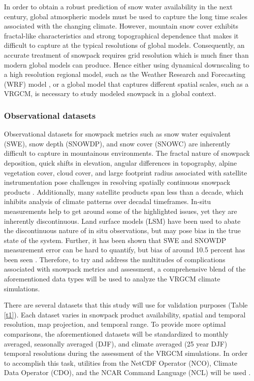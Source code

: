 \documentclass[11pt]{article}
\begin{document}
In order to obtain a robust prediction of snow water availability in the next century, global atmospheric models must be used to capture the long time scales associated with the changing climate.  However, mountain snow cover exhibits fractal-like characteristics and strong topographical dependence that makes it difficult to capture at the typical resolutions of global models. Consequently, an accurate treatment of snowpack requires grid resolution which is much finer than modern global models can produce. Hence either using dynamical downscaling to a high resolution regional model, such as the Weather Research and Forecasting (WRF) model \citep{michalakes2001development}, or a global model that captures different spatial scales, such as a VRGCM, is necessary to study modeled snowpack in a global context.

\subsubsection{Observational datasets} \label{sec:ObservationalData}

Observational datasets for snowpack metrics such as snow water equivalent (SWE), snow depth (SNOWDP), and snow cover (SNOWC) are inherently difficult to capture in mountainous environments.  The fractal nature of snowpack deposition, quick shifts in elevation, angular differences in topography, alpine vegetation cover, cloud cover, and large footprint radius associated with satellite instrumentation pose challenges in resolving spatially continuous snowpack products \citep{brownandmote2009, rutter2009SnowMIP2}.  Additionally, many satellite products span less than a decade, which inhibits analysis of climate patterns over decadal timeframes.  In-situ measurements help to get around some of the highlighted issues, yet they are inherently discontinuous.  Land surface models (LSM) have been used to abate the discontinuous nature of in situ observations, but may pose bias in the true state of the system.  Further, it has been shown that SWE and SNOWDP measurement error can be hard to quantify, but bias of around 10.5 percent has been seen \citep{ rutter2009SnowMIP2}.  Therefore, to try and address the multitudes of complications associated with snowpack metrics and assessment, a comprehensive blend of the aforementioned data types will be used to analyze the VRGCM climate simulations. 

There are several datasets that this study will use for validation purposes (Table \ref{t1}).  Each dataset varies in snowpack product availability, spatial and temporal resolution, map projection, and temporal range.  To provide more optimal comparisons, the aforementioned datasets will be standardized to monthly averaged, seasonally averaged (DJF), and climate averaged (25 year DJF) temporal resolutions during the assessment of the VRGCM simulations.  In order to accomplish this task, utilities from the NetCDF Operator (NCO), Climate Data Operator (CDO), and the NCAR Command Language (NCL) will be used \citep{schulzweida2007cdo,zender2006netcdf}.  
\end{document}
